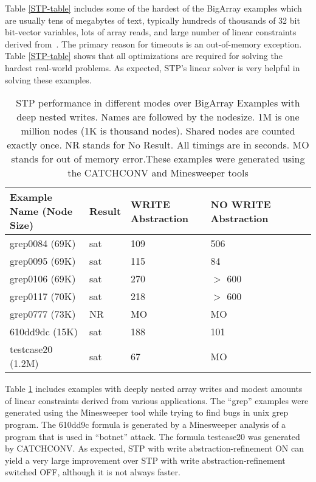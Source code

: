 Table \ref{STP-table} includes some of the hardest of the BigArray
examples which are usually tens of megabytes of text, typically hundreds of
thousands of 32 bit bit-vector variables, lots of array reads, and
large number of linear constraints derived
from~\cite{catchconv07,replayer06}. The primary reason for timeouts is
an out-of-memory exception. Table \ref{STP-table}
shows that all optimizations are required for solving the hardest
real-world problems. As expected, STP's linear solver is very helpful
in solving these examples.

\begin{table}[t]
\begin{center}
\begin{tabular}{|l|l|l|l|l|l|}
\hline
{\bf Example Name (Node Size)} & {\bf Result} & {\bf WRITE Abstraction} & {\bf NO WRITE Abstraction} \\
\hline
grep0084   (69K) & sat & 109 & 506 \\
grep0095   (69K) & sat & 115 & 84 \\
grep0106   (69K) & sat & 270 & $>$ 600 \\
grep0117   (70K) & sat & 218 & $>$ 600 \\
grep0777   (73K) & NR  &  MO & MO \\
610dd9dc   (15K) & sat & 188 & 101 \\
testcase20 (1.2M)& sat & 67  & MO \\
\hline
\end{tabular}
\end{center}
\caption{STP performance in different modes over BigArray Examples
with deep nested writes. Names are followed by the nodesize. 1M is one
million nodes (1K is thousand nodes). Shared nodes are counted exactly
once. NR stands for No Result.  All timings are in seconds. MO stands
for out of memory error.These examples were generated using the
CATCHCONV and Minesweeper tools}
\label{STP-write-abs}
\end{table}

Table \ref{STP-write-abs} includes examples with deeply
nested array writes and modest amounts of linear constraints derived
from various applications. The ``grep'' examples were generated using
the Minesweeper tool while trying to find bugs in unix grep program.
The 610dd9c formula is generated by a Minesweeper analysis of a
program that is used in ``botnet'' attack. The formula testcase20 was
generated by CATCHCONV.
As expected, STP with write abstraction-refinement ON can yield a
very large improvement over STP with write abstraction-refinement
switched OFF, although it is not always faster.

